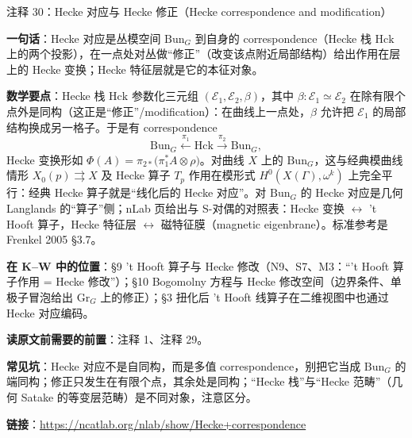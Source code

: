 \begin{kcard}{注释 30：Hecke 对应与 Hecke 修正（Hecke correspondence and modification）}

\textbf{一句话}：Hecke 对应是丛模空间 $\mathrm{Bun}_G$ 到自身的 correspondence（Hecke 栈 $\mathrm{Hck}$ 上的两个投影），在一点处对丛做“修正”（改变该点附近局部结构）给出作用在层上的 Hecke 变换；Hecke 特征层就是它的本征对象。

\textbf{数学要点}：Hecke 栈 $\mathrm{Hck}$ 参数化三元组 $(\mathcal E_1,\mathcal E_2,\beta)$，其中 $\beta:\mathcal E_1\simeq\mathcal E_2$ 在除有限个点外是同构（这正是“修正”/modification）：在曲线上一点处，$\beta$ 允许把 $\mathcal E_1$ 的局部结构换成另一格子。于是有 correspondence
\[
\mathrm{Bun}_G\xleftarrow{\ \pi_1\ }\mathrm{Hck}\xrightarrow{\ \pi_2\ }\mathrm{Bun}_G,
\]
Hecke 变换形如 $\Phi(A)=\pi_{2*}\big(\pi_1^*A\otimes\rho\big)$。对曲线 $X$ 上的 $\mathrm{Bun}_G$，这与经典模曲线情形 $X_0(p)\rightrightarrows X$ 及 Hecke 算子 $T_p$ 作用在模形式 $H^0(X(\Gamma),\omega^k)$ 上完全平行：经典 Hecke 算子就是“线化后的 Hecke 对应”。对 $\mathrm{Bun}_G$ 的 Hecke 对应是几何 Langlands 的“算子”侧；nLab 页给出与 S-对偶的对照表：Hecke 变换 $\leftrightarrow$ 't Hooft 算子，Hecke 特征层 $\leftrightarrow$ 磁特征膜（magnetic eigenbrane）。标准参考是 Frenkel 2005 §3.7。

\textbf{在 K--W 中的位置}：§9 't Hooft 算子与 Hecke 修改（N9、S7、M3：“'t Hooft 算子作用 = Hecke 修改”）；§10 Bogomolny 方程与 Hecke 修改空间（边界条件、单极子冒泡给出 $\mathrm{Gr}_G$ 上的修正）；§3 扭化后 't Hooft 线算子在二维视图中也通过 Hecke 对应编码。

\textbf{读原文前需要的前置}：注释 1、注释 29。

\textbf{常见坑}：Hecke 对应不是自同构，而是多值 correspondence，别把它当成 $\mathrm{Bun}_G$ 的端同构；修正只发生在有限个点，其余处是同构；“Hecke 栈”与“Hecke 范畴”（几何 Satake 的等变层范畴）是不同对象，注意区分。

\noindent\textbf{链接}：\url{https://ncatlab.org/nlab/show/Hecke+correspondence}
\end{kcard}

